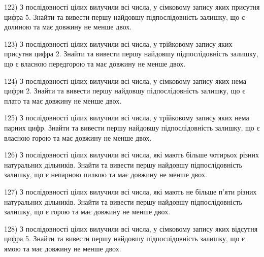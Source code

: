 \documentclass[11pt, ukrainian]{article}
\begin{document}
\par
\vspace{0.9cm}
122) \space 
З послідовності цілих вилучили всі числа, у сімковому запису яких присутня цифра 5. Знайти та вивести першу найдовшу підпослідовність залишку, що є долиною та має довжину не менше двох.

\par
\vspace{0.9cm}
123) \space 
З послідовності цілих вилучили всі числа, у трійковому запису яких присутня цифра 2. Знайти та вивести першу найдовшу підпослідовність залишку, що є власною передгорою та має довжину не менше двох.

\par
\vspace{0.9cm}
124) \space 
З послідовності цілих вилучили всі числа, у сімковому запису яких нема цифри 2. Знайти та вивести першу найдовшу підпослідовність залишку, що є плато та має довжину не менше двох.

\par
\vspace{0.9cm}
125) \space 
З послідовності цілих вилучили всі числа, у трійковому запису яких нема парних цифр. Знайти та вивести першу найдовшу підпослідовність залишку, що є власною горою та має довжину не менше двох.

\par
\vspace{0.9cm}
126) \space 
З послідовності цілих вилучили всі числа, які мають більше чотирьох різних натуральних дільників. Знайти та вивести першу найдовшу підпослідовність залишку, що є непарною пилкою та має довжину не менше двох.

\par
\vspace{0.9cm}
127) \space 
З послідовності цілих вилучили всі числа, які мають не більше п'яти різних натуральних дільників. Знайти та вивести першу найдовшу підпослідовність залишку, що є горою та має довжину не менше двох.

\par
\vspace{0.9cm}
128) \space 
З послідовності цілих вилучили всі числа, у сімковому запису яких відсутня цифра 5. Знайти та вивести першу найдовшу підпослідовність залишку, що є ямою та має довжину не менше двох.
\end{document}
